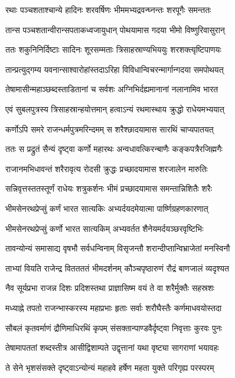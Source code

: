 \twolineshloka
{रथाः पञ्चशताश्चान्ये हादिनः शरवर्षिणः}
{भीममभ्यद्रवन्घ्नन्तः शरपूगैः समन्ततः}


\twolineshloka
{तान्स पञ्चशतान्वीरान्सपताकध्वजायुधान्}
{पोथयामास गदया भीमो विष्णुरिवासुरान्}


\twolineshloka
{ततः शकुनिनिर्दिष्टाः सादिनः शूरसम्मताः}
{त्रिसाहस्राण्यभिययुः शरशक्त्यृष्टिपाणयः}


\twolineshloka
{तान्प्रत्युद्गम्य यवनान्साश्वारोहांस्तदाऽरिहा}
{विविधान्विचरन्मार्गान्गदया समपोथयत्}


\twolineshloka
{तेषामासीन्महाञ्छब्दस्ताडितानां च सर्वशः}
{अग्निभिर्दह्यमानानां नलानामिव भारत}


\twolineshloka
{एवं सुबलपुत्रस्य त्रिसाहस्रान्हयोत्तमान्}
{हत्वाऽन्यं रथमास्थाय क्रुद्धो राधेयमभ्ययात्}


\twolineshloka
{कर्णोऽपि समरे राजन्धर्मपुत्रमरिन्दमम्}
{स शरैश्छादयामास सारथिं चाप्यपातयत्}


\twolineshloka
{ततः स प्रद्रुतं सैन्यं दृष्ट्वा कर्णो महारथः}
{अन्वधावत्किरन्बाणैः कङ्कपत्रैरजिह्मगैः}


\twolineshloka
{राजानमभिधावन्तं शरैरावृत्य रोदसी}
{क्रुद्धः प्रच्छादयामास शरजालेन मारुतिः}


\twolineshloka
{सन्निवृत्तस्ततस्तूर्णं राधेयः शत्रुकर्शनः}
{भीमं प्रच्छादयामास समन्तान्निशितैः शरैः}


\twolineshloka
{भीमसेनरथप्रेप्सुं कर्णं भारत सात्यकिः}
{अभ्यर्दयदमेयात्मा पार्ष्णिग्रहणकारणात्}


\twolineshloka
{भीमसेनरथप्रेप्सुं कर्णो भारत सात्यकिम्}
{अभ्यवर्तत शैनेयमर्दयञ्छरवृष्टिभिः}


\twolineshloka
{तावन्योन्यं समासाद्य वृषभौ सर्वधन्विनाम्}
{विसृजन्तौ शरान्दीप्तान्विभ्राजेतां मनस्विनौ}


\twolineshloka
{ताभ्यां वियति राजेन्द्र विततततं भीमदर्शनम्}
{कौञ्चपृष्ठारुणं रौद्रं बाणजालं व्यदृश्यत}


\twolineshloka
{नैव सूर्यप्रभा राजन्न दिशः प्रदिशस्तथा}
{प्राज्ञासिष्म वयं ते वा शरैर्मुक्तैः सहस्रशः}


\twolineshloka
{मध्याह्ने तपतो राजन्भास्करस्य महाप्रभाः}
{हृताः सर्वाः शरौघैस्तैः कर्णमाधवयोस्तदा}


\twolineshloka
{सौबलं कृतवर्माणं द्रौणिमाधिरथिं कृपम्}
{संसक्तान्पाण्डवैर्दृष्ट्वा निवृत्ताः कुरवः पुनः}


\twolineshloka
{तेषामापततां शब्दस्तीत्र आसीद्विशाम्पते}
{उद्वृत्तानां यथा वृष्ट्या सागराणां भयावहः}


\twolineshloka
{ते सेने भृशसंसक्ते दृष्ट्वाऽन्योन्यं महाहवे}
{हर्षेण महता युक्ते परिगृह्य परस्परम्}


